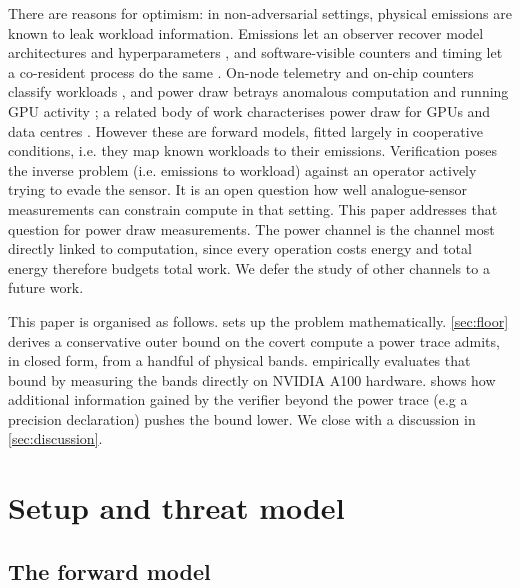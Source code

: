 \documentclass{article}
\theoremstyle{plain}
\theoremstyle{definition}
\theoremstyle{remark}
\begin{document}
There are reasons for optimism: in non-adversarial settings, physical
emissions are known to leak workload information. Emissions let an observer recover
model architectures and hyperparameters
\citep{hu2020deepsniffer,maia2022magnetic,gao2023deeptheft,chaudhuri2025energon},
and software-visible counters and timing let a co-resident process do the
same \citep{naghibijouybari2018rendered,wei2020leaky}. On-node telemetry
and on-chip counters classify workloads
\citep{tang2022supercloud,xu2026wave,gangwal2019cryptomining}, and power
draw betrays anomalous computation \citep{clark2013wattsupdoc} and running
GPU activity \citep{arefin2024hdmi}; a related body of work characterises
power draw for GPUs and data centres
\citep{patel2023polca,choukse2025power,latif2025power}. However these are forward models, fitted largely in cooperative conditions, i.e. they map known
workloads to their emissions. Verification poses the inverse
problem (i.e. emissions to workload) against an operator actively trying to
evade the sensor. It is an open question how well analogue-sensor
measurements can constrain compute in that setting. This paper addresses that
question for power draw measurements. The power channel is the channel most directly linked to
computation, since every operation costs energy and total energy therefore
budgets total work. We defer the study of other channels to a future work.

This paper is organised as follows.  sets up the problem mathematically.
\cref{sec:floor} derives a conservative outer bound on the covert compute a
power trace admits, in closed form, from a handful of physical bands.
 empirically evaluates that bound by measuring the
bands directly on NVIDIA A100 hardware.
 shows how additional information gained by the
verifier beyond the power trace (e.g a precision declaration) pushes the bound lower. We close with a discussion in
\cref{sec:discussion}.

\section{Setup and threat model}
\label{sec:setup}

\subsection{The forward model}
\label{subsec:forward}
\end{document}
